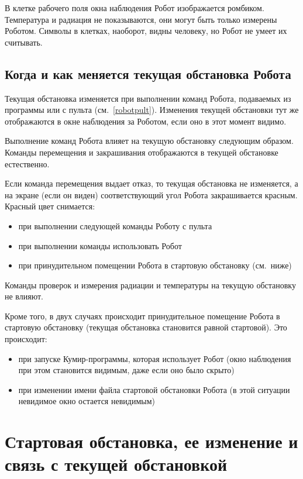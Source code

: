 В клетке рабочего поля окна наблюдения Робот изображается ромбиком. Температура и радиация не показываются, они могут быть только измерены Роботом. Символы в клетках, наоборот, видны человеку, но Робот не умеет их считывать.

\subsection{Когда и как меняется текущая обстановка Робота}

Текущая обстановка изменяется при выполнении команд Робота, подаваемых из программы или с пульта (см.~\ref{robotpult}). Изменения текущей обстановки тут же отображаются в окне наблюдения за Роботом, если оно в этот момент видимо.

Выполнение команд Робота влияет на текущую обстановку следующим образом. Команды перемещения и закрашивания отображаются в текущей обстановке естественно.

Если команда перемещения выдает отказ, то текущая обстановка не изменяется, а на экране (если он виден) соответствующий угол Робота закрашивается красным. Красный цвет снимается:
\begin{itemize}
\item при выполнении следующей команды Роботу с пульта
\item при выполнении команды \textsf{использовать Робот}
\item при принудительном помещении Робота в стартовую обстановку (см.~ниже)
\end{itemize}

Команды проверок и измерения радиации и температуры на текущую обстановку не влияют.

Кроме того, в двух случаях происходит принудительное помещение Робота в стартовую обстановку (текущая обстановка становится равной стартовой). Это происходит:
\begin{itemize}
\item при запуске Кумир-программы, которая использует Робот (окно наблюдения при этом становится видимым, даже если оно было скрыто)
\item при изменении имени файла стартовой обстановки Робота (в этой ситуации невидимое окно остается невидимым)
\end{itemize}

\section{Стартовая обстановка, ее изменение и связь с текущей обстановкой}
\label{robotstartfield}

